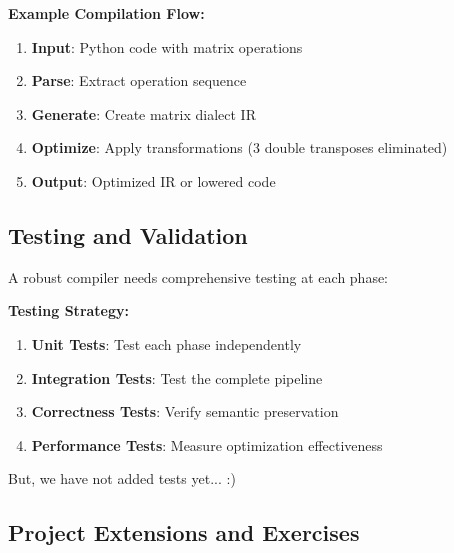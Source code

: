 \documentclass[11pt,a4paper]{article}
\begin{document}
\textbf{Example Compilation Flow:}
\begin{enumerate}
    \item \textbf{Input}: Python code with matrix operations
    \item \textbf{Parse}: Extract operation sequence
    \item \textbf{Generate}: Create matrix dialect IR
    \item \textbf{Optimize}: Apply transformations (3 double transposes eliminated)
    \item \textbf{Output}: Optimized IR or lowered code
\end{enumerate}
\subsection{Testing and Validation}

A robust compiler needs comprehensive testing at each phase:

\textbf{Testing Strategy:}
\begin{enumerate}
    \item \textbf{Unit Tests}: Test each phase independently
    \item \textbf{Integration Tests}: Test the complete pipeline
    \item \textbf{Correctness Tests}: Verify semantic preservation
    \item \textbf{Performance Tests}: Measure optimization effectiveness
\end{enumerate}

But, we have not added tests yet... :)

\subsection{Project Extensions and Exercises}
\end{document}
